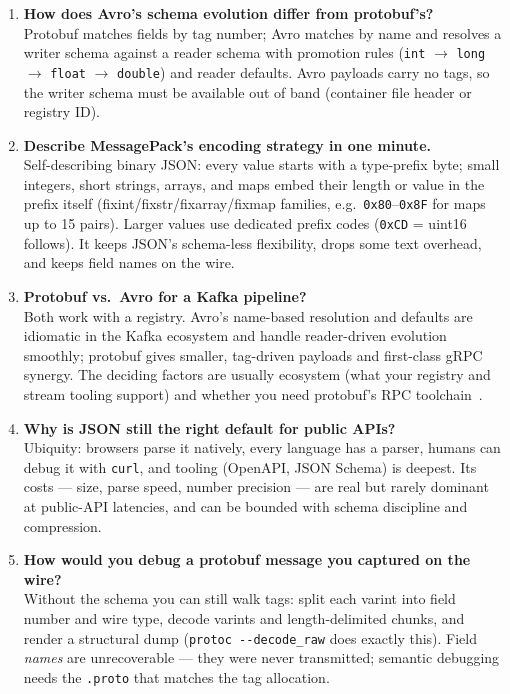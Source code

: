 \begin{enumerate}[label=\textbf{Q\arabic*.}, leftmargin=1.3cm, itemsep=0.8em]
\item \textbf{How does Avro's schema evolution differ from protobuf's?}\\
Protobuf matches fields by tag number; Avro matches by name and resolves a writer
schema against a reader schema with promotion rules (\texttt{int} $\to$
\texttt{long} $\to$ \texttt{float} $\to$ \texttt{double}) and reader defaults.
Avro payloads carry no tags, so the writer schema must be available out of band
(container file header or registry ID).

\item \textbf{Describe MessagePack's encoding strategy in one minute.}\\
Self-describing binary JSON: every value starts with a type-prefix byte; small
integers, short strings, arrays, and maps embed their length or value in the
prefix itself (fixint/fixstr/fixarray/fixmap families, e.g.\ \texttt{0x80}--\texttt{0x8F}
for maps up to 15 pairs). Larger values use dedicated prefix codes (\texttt{0xCD}
= uint16 follows). It keeps JSON's schema-less flexibility, drops some text
overhead, and keeps field names on the wire.

\item \textbf{Protobuf vs.\ Avro for a Kafka pipeline?}\\
Both work with a registry. Avro's name-based resolution and defaults are
idiomatic in the Kafka ecosystem and handle reader-driven evolution smoothly;
protobuf gives smaller, tag-driven payloads and first-class gRPC synergy. The
deciding factors are usually ecosystem (what your registry and stream tooling
support) and whether you need protobuf's RPC toolchain~\cite{kleppmann2017ddia}.

\item \textbf{Why is JSON still the right default for public APIs?}\\
Ubiquity: browsers parse it natively, every language has a parser, humans can
debug it with \texttt{curl}, and tooling (OpenAPI, JSON Schema) is deepest. Its
costs --- size, parse speed, number precision --- are real but rarely dominant at
public-API latencies, and can be bounded with schema discipline and compression.

\item \textbf{How would you debug a protobuf message you captured on the wire?}\\
Without the schema you can still walk tags: split each varint into field number
and wire type, decode varints and length-delimited chunks, and render a structural
dump (\texttt{protoc -{}-decode\_raw} does exactly this). Field \emph{names} are
unrecoverable --- they were never transmitted; semantic debugging needs the
\texttt{.proto} that matches the tag allocation.


\end{enumerate}
